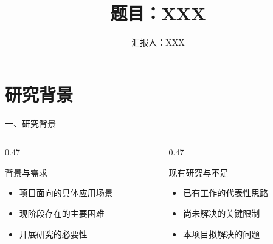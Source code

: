 \documentclass[10pt,aspectratio=169]{beamer}
\title[项目汇报]{题目：XXX}
\subtitle{}
\author{汇报人：XXX}
\institute{XXX研究部}
\date{\PCLtoday}
\begin{document}
\maketitle
\PCLcontents

\section{研究背景}
\begin{frame}{一、研究背景}
  \vspace{0.5cm}
  \begin{columns}[T,onlytextwidth]
    \begin{column}{0.47\textwidth}
      \begin{block}{背景与需求}
        \begin{itemize}
          \setlength{\itemsep}{0.7em}
          \item 项目面向的具体应用场景
          \item 现阶段存在的主要困难
          \item 开展研究的必要性
        \end{itemize}
      \end{block}
    \end{column}
    \begin{column}{0.47\textwidth}
      \begin{block}{现有研究与不足}
        \begin{itemize}
          \setlength{\itemsep}{0.7em}
          \item 已有工作的代表性思路
          \item 尚未解决的关键限制
          \item 本项目拟解决的问题
        \end{itemize}
      \end{block}
    \end{column}
  \end{columns}
  \vfill
\end{frame}
\end{document}
